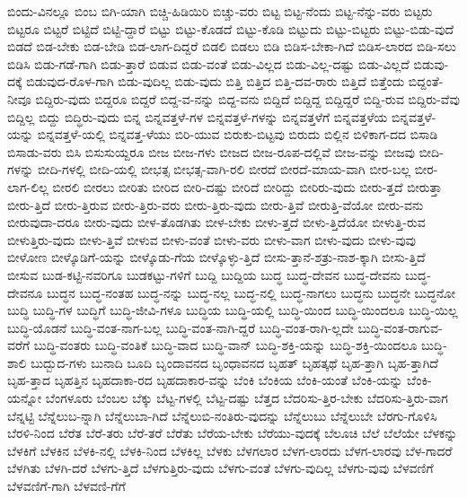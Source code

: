 {ಬಿಂದು-ವಿನಲ್ಲೂ
ಬಿಂಬ
ಬಿಗಿ-ಯಾಗಿ
ಬಿಚ್ಚಿ-ಹಿಡಿಯಿರಿ
ಬಿಚ್ಚು-ವರು
ಬಿಟ್ಟ
ಬಿಟ್ಟ-ನೆಂದು
ಬಿಟ್ಟ-ನೆನ್ನು-ವರು
ಬಿಟ್ಟರು
ಬಿಟ್ಟರೂ
ಬಿಟ್ಟರೆ
ಬಿಟ್ಟಿದೆ
ಬಿಟ್ಟಿ-ದ್ದಾರೆ
ಬಿಟ್ಟು
ಬಿಟ್ಟು-ಕೊಡದೆ
ಬಿಟ್ಟು-ಕೊಡಿ
ಬಿಟ್ಟುದು
ಬಿಟ್ಟು-ಬಿಟ್ಟರು
ಬಿಟ್ಟು-ಬಿಡು-ವುದೆ
ಬಿಡದೆ
ಬಿಡ-ಬೇಕು
ಬಿಡ-ಬೇಡಿ
ಬಿಡ-ಲಾಗ-ದಿದ್ದರೆ
ಬಿಡಲಿ
ಬಿಡಲು
ಬಿಡಿ
ಬಿಡಿಸ-ಬೇಕಾ-ಗಿದೆ
ಬಿಡಿಸ-ಲಾರದ
ಬಿಡಿ-ಸಲು
ಬಿಡಿಸಿ
ಬಿಡು-ಗಡೆ-ಗಾಗಿ
ಬಿಡು-ತ್ತಾರೆ
ಬಿಡುವ
ಬಿಡು-ವಂತೆ
ಬಿಡು-ವಿಲ್ಲದ
ಬಿಡು-ವಿಲ್ಲ-ದಷ್ಟು
ಬಿಡು-ವಿಲ್ಲದೆ
ಬಿಡುವು-ದಕ್ಕೆ
ಬಿಡುವುದ-ರೊಳ-ಗಾಗಿ
ಬಿಡು-ವುದಿಲ್ಲ
ಬಿಡು-ವುದು
ಬಿತ್ತಿ
ಬಿತ್ತಿದ
ಬಿತ್ತಿ-ದವ-ರಾರು
ಬಿತ್ತಿದೆ
ಬಿತ್ತೆಂದು
ಬಿದ್ದಂತೆ-ನೀವೂ
ಬಿದ್ದಿರು-ವುದು
ಬಿದ್ದರೂ
ಬಿದ್ದರೆ
ಬಿದ್ದ-ವ-ನನ್ನು
ಬಿದ್ದ-ವನು
ಬಿದ್ದಿದೆ
ಬಿದ್ದಿದ್ದ
ಬಿದ್ದಿದ್ದರೆ
ಬಿದ್ದಿ-ರುವ
ಬಿದ್ದಿರು-ವೆವು
ಬಿದ್ದಿಲ್ಲ
ಬಿದ್ದು
ಬಿದ್ಧಿರು-ವುದು
ಬಿನ್ನ
ಬಿನ್ನವತ್ತಳೆ-ಗಳ
ಬಿನ್ನವತ್ತಳೆ-ಗಳನ್ನು
ಬಿನ್ನವತ್ತಳೆಗೆ
ಬಿನ್ನವತ್ತಳೆಯ
ಬಿನ್ನವತ್ತಳೆ-ಯನ್ನು
ಬಿನ್ನವತ್ತಳೆ-ಯಲ್ಲಿ
ಬಿನ್ನವತ್ತ-ಳೆಯು
ಬಿರಿ-ಯುವ
ಬಿರುಕು-ಬಿಟ್ಟವು
ಬಿರುದು
ಬಿಲ್ಲಿನ
ಬಿಳಿಕಾಗ-ದದ
ಬಿಸಾಡಿ
ಬಿಸಾಡು-ವರು
ಬಿಸಿ
ಬಿಸುಸುಯ್ದರೂ
ಬೀಜ
ಬೀಜ-ಗಳು
ಬೀಜದ
ಬೀಜ-ರೂಪ-ದಲ್ಲಿವೆ
ಬೀಜ-ವನ್ನು
ಬೀಜವು
ಬೀದಿ-ಗಳನ್ನು
ಬೀದಿ-ಗಳಲ್ಲಿ
ಬೀದಿ-ಯಲ್ಲಿ
ಬೀಭತ್ಸ
ಬೀಭತ್ಸ-ವಾಗಿ-ರಲಿ
ಬೀರದೆ
ಬೀರದೆ-ಮಾಯ-ವಾಗಿ
ಬೀರ-ಬಲ್ಲ
ಬೀರ-ಲಾಗ-ಲಿಲ್ಲ
ಬೀರಲಿ
ಬೀರಲು
ಬೀರಿತು
ಬೀರಿದ
ಬೀರಿ-ದಷ್ಟು
ಬೀರಿದೆ
ಬೀರಿದ್ದು
ಬೀರಿರು-ವುದು
ಬೀರು-ತ್ತದೆ
ಬೀರುತ್ತಾ
ಬೀರು-ತ್ತಿದೆ
ಬೀರು-ತ್ತಿರುವ
ಬೀರು-ತ್ತಿರು-ವರು
ಬೀರು-ತ್ತಿರು-ವುದು
ಬೀರು-ತ್ತಿವೆ
ಬೀರುತ್ತಿ-ವೆಯೋ
ಬೀರು-ವನು
ಬೀರುವುದಾ-ದರೂ
ಬೀರು-ವುದು
ಬೀಳ-ತೊಡಗಿತು
ಬೀಳ-ಬೇಕು
ಬೀಳು-ತ್ತದೆ
ಬೀಳು-ತ್ತಿದೆಯೋ
ಬೀಳುತ್ತಿ-ರುವ
ಬೀಳುತ್ತಿರು-ವುದು
ಬೀಳು-ತ್ತಿವೆ
ಬೀಳುವ
ಬೀಳು-ವಂತೆ
ಬೀಳು-ವರು
ಬೀಳು-ವಾಗ
ಬೀಳು-ವುದು
ಬೀಳು-ವುವು
ಬೀಳೋಣ
ಬೀಳ್ಕೊಡಿಗೆ-ಯನ್ನು
ಬೀಳ್ಕೊಡು-ಗೆಯ
ಬೀಳ್ಕೊಳ್ಳು-ತ್ತಿದೆ
ಬೀಸು-ತ್ತಾನೆ-ಶತ್ರು-ನಾಶ-ಕ್ಕಾಗಿ
ಬೀಸು-ತ್ತಿದೆ
ಬೀಸುವ
ಬುಡ-ಕಟ್ಟಿ-ನವರಿಗೂ
ಬುಡಕಟ್ಟು-ಗಳಿಗೆ
ಬುದ್ದಿ
ಬುದ್ದಿಯ
ಬುದ್ಧ
ಬುದ್ಧ-ದೇವನ
ಬುದ್ಧ-ದೇವನು
ಬುದ್ಧ-ದೇವನೂ
ಬುದ್ಧನ
ಬುದ್ಧ-ನಂತಹ
ಬುದ್ಧ-ನನ್ನು
ಬುದ್ಧ-ನಲ್ಲ
ಬುದ್ಧ-ನಲ್ಲಿ
ಬುದ್ಧ-ನಾಗಲು
ಬುದ್ಧನು
ಬುದ್ಧನೇ
ಬುದ್ಧನೋ
ಬುದ್ಧಿ
ಬುದ್ಧಿ-ಗಳ
ಬುದ್ಧಿಗೆ
ಬುದ್ಧಿ-ಜೀವಿ-ಗಳೂ
ಬುದ್ಧಿಯ
ಬುದ್ಧಿ-ಯಲ್ಲಿ
ಬುದ್ಧಿ-ಯಿಂದ
ಬುದ್ಧಿ-ಯಿಂದಲೂ
ಬುದ್ಧಿ-ಯಿಲ್ಲ
ಬುದ್ಧಿ-ಯೊಡನೆ
ಬುದ್ಧಿ-ವಂತ-ನಾಗ-ಬಲ್ಲ
ಬುದ್ಧಿ-ವಂತ-ನಾಗಿ-ದ್ದರೆ
ಬುದ್ಧಿ-ವಂತ-ರಾಗಿ-ಲ್ಲದೇ
ಬುದ್ಧಿ-ವಂತ-ರಾಗುವ-ವರೆಗೆ
ಬುದ್ಧಿ-ವಂತರು
ಬುದ್ಧಿ-ವಂತಿಕೆ
ಬುದ್ಧಿ-ವಾದ
ಬುದ್ಧಿ-ವಾನ್
ಬುದ್ಧಿ-ಶಕ್ತಿ-ಯನ್ನು
ಬುದ್ಧಿ-ಶಕ್ತಿ-ಯಿಂದಲೂ
ಬುದ್ಧಿ-ಶಾಲಿ
ಬುದ್ಬುದ-ಗಳು
ಬುನಾದಿ
ಬೂದಿ
ಬೃಂದಾವನದ
ಬೃಂಧಾವನದ
ಬೃಹತ್
ಬೃಹತ್ಕಥೆ
ಬೃಹ-ತ್ತಾಗಿ
ಬೃಹ-ತ್ತಾಗಿದೆ
ಬೃಹ-ತ್ತಾದ
ಬೃಹತ್ತಿನ
ಬೃಹದಾಕಾ-ರದ
ಬೃಹದಾಕಾರ-ವನ್ನು
ಬೆಂಕಿ
ಬೆಂಕಿಯ
ಬೆಂಕಿ-ಯಂತೆ
ಬೆಂಕಿ-ಯನ್ನು
ಬೆಂಕಿ-ಯನ್ನೋ
ಬೆಂಗಳೂರು
ಬೆಂಬಲ
ಬೆಕ್ಕು
ಬೆಟ್ಟ-ಗಳಲ್ಲಿ
ಬೆಟ್ಟ-ದಷ್ಟು
ಬೆತ್ತದ
ಬೆದರಿಸು-ತ್ತಿರ-ಬೇಕು
ಬೆದರಿಸು-ತ್ತಿರು-ವಾಗ
ಬೆನ್ನಟ್ಟಿ
ಬೆನ್ನೆಲುಬ-ನ್ನಾಗಿ
ಬೆನ್ನೆಲುಬಾ-ಗಿದೆ
ಬೆನ್ನೆಲುಬಿ-ನಂತಿರು-ವುದನ್ನು
ಬೆನ್ನೆಲುಬು
ಬೆನ್ನೆಲುಬೇ
ಬೆರಗು-ಗೊಳಿಸಿ
ಬೆರಳಿ-ನಿಂದ
ಬೆರೆತ
ಬೆರೆ-ತರು
ಬೆರೆ-ತರೆ
ಬೆರೆತು
ಬೆರೆಯ-ಬೇಕು
ಬೆರೆಯು-ವುದಕ್ಕೆ
ಬೆಲೂಚಿ
ಬೆಲೆ
ಬೆಲೆಯೇ
ಬೆಳಕನ್ನು
ಬೆಳಕಿಗೆ
ಬೆಳಕಿನ
ಬೆಳಕಿ-ನಲ್ಲಿ
ಬೆಳಕಿ-ನಿಂದ
ಬೆಳಕಿಲ್ಲ
ಬೆಳಕು
ಬೆಳಗಲಾರ
ಬೆಳಗ-ಲಾರದು
ಬೆಳಗ-ಲಾರವು
ಬೆಳ-ಗಾದರೆ
ಬೆಳಗಿತು
ಬೆಳಗಿ-ದರೆ
ಬೆಳಗು-ತ್ತಿದೆ
ಬೆಳಗುತ್ತಿರು-ವುದು
ಬೆಳಗು-ವಂತೆ
ಬೆಳಗು-ವುದಿಲ್ಲ
ಬೆಳಗು-ವುವು
ಬೆಳವಣಿಗೆ
ಬೆಳವಣಿಗೆ-ಗಾಗಿ
ಬೆಳವಣಿ-ಗೆಗೆ
}
